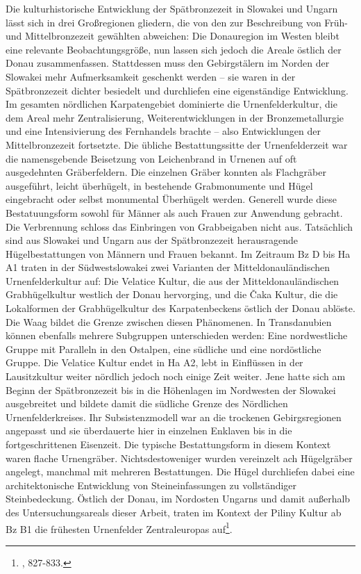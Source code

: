 \documentclass[openany,twoside,twocolumn]{book}
\let\rmarkdownfootnote\footnote%
\def\footnote{\protect\rmarkdownfootnote}
\begin{document}
Die kulturhistorische Entwicklung der Spätbronzezeit in Slowakei und
Ungarn lässt sich in drei Großregionen gliedern, die von den zur
Beschreibung von Früh- und Mittelbronzezeit gewählten abweichen: Die
Donauregion im Westen bleibt eine relevante Beobachtungsgröße, nun
lassen sich jedoch die Areale östlich der Donau zusammenfassen.
Stattdessen muss den Gebirgstälern im Norden der Slowakei mehr
Aufmerksamkeit geschenkt werden -- sie waren in der Spätbronzezeit
dichter besiedelt und durchliefen eine eigenständige Entwicklung. Im
gesamten nördlichen Karpatengebiet dominierte die Urnenfelderkultur, die
dem Areal mehr Zentralisierung, Weiterentwicklungen in der
Bronzemetallurgie und eine Intensivierung des Fernhandels brachte --
also Entwicklungen der Mittelbronzezeit fortsetzte. Die übliche
Bestattungssitte der Urnenfelderzeit war die namensgebende Beisetzung
von Leichenbrand in Urnenen auf oft ausgedehnten Gräberfeldern. Die
einzelnen Gräber konnten als Flachgräber ausgeführt, leicht überhügelt,
in bestehende Grabmonumente und Hügel eingebracht oder selbst monumental
Überhügelt werden. Generell wurde diese Bestatuungsform sowohl für
Männer als auch Frauen zur Anwendung gebracht. Die Verbrennung schloss
das Einbringen von Grabbeigaben nicht aus. Tatsächlich sind aus Slowakei
und Ungarn aus der Spätbronzezeit herausragende Hügelbestattungen von
Männern und Frauen bekannt. Im Zeitraum Bz D bis Ha A1 traten in der
Südwestslowakei zwei Varianten der Mitteldonauländischen
Urnenfelderkultur auf: Die Velatice Kultur, die aus der
Mitteldonauländischen Grabhügelkultur westlich der Donau hervorging, und
die Čaka Kultur, die die Lokalformen der Grabhügelkultur des
Karpatenbeckens östlich der Donau ablöste. Die Waag bildet die Grenze
zwischen diesen Phänomenen. In Transdanubien können ebenfalls mehrere
Subgruppen unterschieden werden: Eine nordwestliche Gruppe mit Paralleln
in den Ostalpen, eine südliche und eine nordöstliche Gruppe. Die
Velatice Kultur endet in Ha A2, lebt in Einflüssen in der Lausitzkultur
weiter nördlich jedoch noch einige Zeit weiter. Jene hatte sich am
Beginn der Spätbronzezeit bis in die Höhenlagen im Nordwesten der
Slowakei ausgebreitet und bildete damit die südliche Grenze des
Nördlichen Urnenfelderkreises. Ihr Subsistenzmodell war an die trockenen
Gebirgsregionen angepasst und sie überdauerte hier in einzelnen Enklaven
bis in die fortgeschrittenen Eisenzeit. Die typische Bestattungsform in
diesem Kontext waren flache Urnengräber. Nichtsdestoweniger wurden
vereinzelt ach Hügelgräber angelegt, manchmal mit mehreren Bestattungen.
Die Hügel durchliefen dabei eine architektonische Entwicklung von
Steineinfassungen zu vollständiger Steinbedeckung. Östlich der Donau, im
Nordosten Ungarns und damit außerhalb des Untersuchungsareals dieser
Arbeit, traten im Kontext der Piliny Kultur ab Bz B1 die frühesten
Urnenfelder Zentraleuropas auf\footnote{\textcite{markova_slovakia_2013},
  827-833.}.
\end{document}
